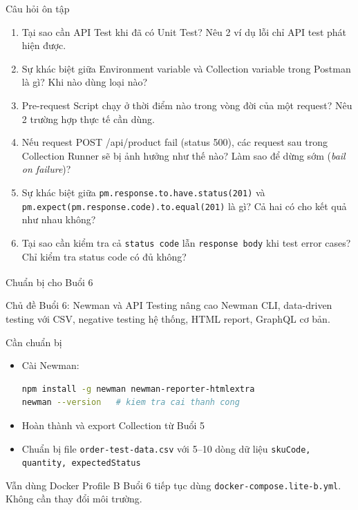 \documentclass[aspectratio=169,10pt]{beamer}
\newcommand{\sref}[1]{\textsuperscript{\scriptsize\cite{#1}}}
\begin{document}
\begin{frame}{Câu hỏi ôn tập}
  \begin{enumerate}
    \item Tại sao cần API Test khi đã có Unit Test?
      Nêu 2 ví dụ lỗi chỉ API test phát hiện được.

    \item Sự khác biệt giữa Environment variable và Collection variable
      trong Postman là gì? Khi nào dùng loại nào?

    \item Pre-request Script chạy ở thời điểm nào trong vòng đời
      của một request? Nêu 2 trường hợp thực tế cần dùng.

    \item Nếu request POST /api/product fail (status 500),
      các request sau trong Collection Runner sẽ bị ảnh hưởng
      như thế nào? Làm sao để dừng sớm (\textit{bail on failure})?

    \item Sự khác biệt giữa \texttt{pm.response.to.have.status(201)}
      và \texttt{pm.expect(pm.response.code).to.equal(201)} là gì?
      Cả hai có cho kết quả như nhau không?

    \item Tại sao cần kiểm tra cả \texttt{status code} lẫn \texttt{response body}
      khi test error cases? Chỉ kiểm tra status code có đủ không?
  \end{enumerate}
\end{frame}

\begin{frame}[fragile]{Chuẩn bị cho Buổi 6\sref{newman}}
  \begin{block}{Chủ đề Buổi 6: Newman và API Testing nâng cao}
    Newman CLI, data-driven testing với CSV, negative testing
    hệ thống, HTML report, GraphQL cơ bản.
  \end{block}

  \vspace{0.4em}
  \begin{block}{Cần chuẩn bị}
    \begin{itemize}
      \item Cài Newman:
\begin{lstlisting}[language=bash,style=nonumber]
npm install -g newman newman-reporter-htmlextra
newman --version   # kiem tra cai thanh cong
\end{lstlisting}
      \item Hoàn thành và export Collection từ Buổi 5
      \item Chuẩn bị file \texttt{order-test-data.csv} với 5--10 dòng dữ liệu
        \texttt{skuCode, quantity, expectedStatus}
    \end{itemize}
  \end{block}

  \begin{alertblock}{Vẫn dùng Docker Profile B}
    Buổi 6 tiếp tục dùng \texttt{docker-compose.lite-b.yml}.
    Không cần thay đổi môi trường.
  \end{alertblock}
\end{frame}
\end{document}
